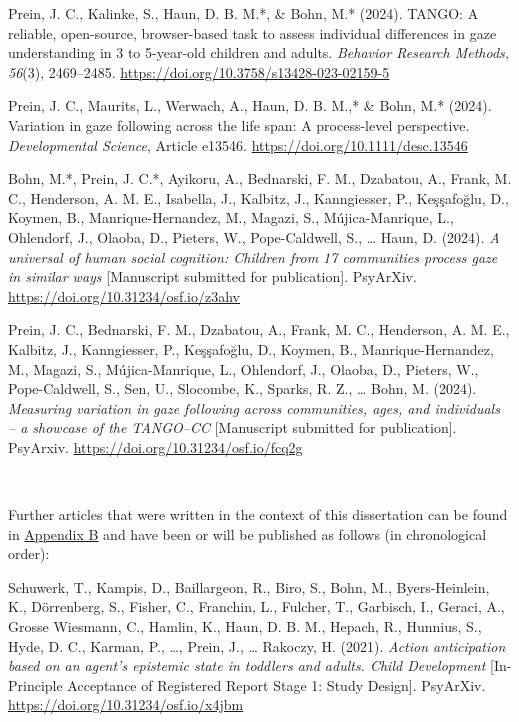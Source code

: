 \documentclass[
]{scrbook}
\begin{document}
Prein, J. C., Kalinke, S., Haun, D. B. M.*, \& Bohn, M.* (2024). TANGO: A reliable, open-source, browser-based task to assess individual differences in gaze understanding in 3 to 5-year-old children and adults. \emph{Behavior Research Methods, 56}(3), 2469--2485. \mbox{\url{https://doi.org/10.3758/s13428-023-02159-5}}

Prein, J. C., Maurits, L., Werwach, A., Haun, D. B. M.,* \& Bohn, M.* (2024). Variation in gaze following across the life span: A process-level perspective. \emph{Developmental Science}, Article e13546. \mbox{\url{https://doi.org/10.1111/desc.13546}}

Bohn, M.*, Prein, J. C.*, Ayikoru, A., Bednarski, F. M., Dzabatou, A., Frank, M. C., Henderson, A. M. E., Isabella, J., Kalbitz, J., Kanngiesser, P., Keşşafoğlu, D., Koymen, B., Manrique-Hernandez, M., Magazi, S., Mújica-Manrique, L., Ohlendorf, J., Olaoba, D., Pieters, W., Pope-Caldwell, S., \ldots{} Haun, D. (2024). \emph{A universal of human social cognition: Children from 17 communities process gaze in similar ways} {[}Manuscript submitted for publication{]}. PsyArXiv. \mbox{\url{https://doi.org/10.31234/osf.io/z3ahv}}

Prein, J. C., Bednarski, F. M., Dzabatou, A., Frank, M. C., Henderson, A. M. E., Kalbitz, J., Kanngiesser, P., Keşşafoğlu, D., Koymen, B., Manrique-Hernandez, M., Magazi, S., Mújica-Manrique, L., Ohlendorf, J., Olaoba, D., Pieters, W., Pope-Caldwell, S., Sen, U., Slocombe, K., Sparks, R. Z., \ldots{} Bohn, M. (2024). \emph{Measuring variation in gaze following across communities, ages, and individuals -- a showcase of the TANGO--CC} {[}Manuscript submitted for publication{]}. PsyArxiv. \mbox{\url{https://doi.org/10.31234/osf.io/fcq2g}}

~

Further articles that were written in the context of this dissertation can be found in \hyperref[appendixB]{Appendix B} and have been or will be published as follows (in chronological order):

Schuwerk, T., Kampis, D., Baillargeon, R., Biro, S., Bohn, M., Byers-Heinlein, K., Dörrenberg, S., Fisher, C., Franchin, L., Fulcher, T., Garbisch, I., Geraci, A., Grosse Wiesmann, C., Hamlin, K., Haun, D. B. M., Hepach, R., Hunnius, S., Hyde, D. C., Karman, P., \ldots, Prein, J., \ldots{} Rakoczy, H. (2021). \emph{Action anticipation based on an agent's epistemic state in toddlers and adults. Child Development} {[}In-Principle Acceptance of Registered Report Stage 1: Study Design{]}. PsyArXiv. \mbox{\url{https://doi.org/10.31234/osf.io/x4jbm}}
\end{document}
